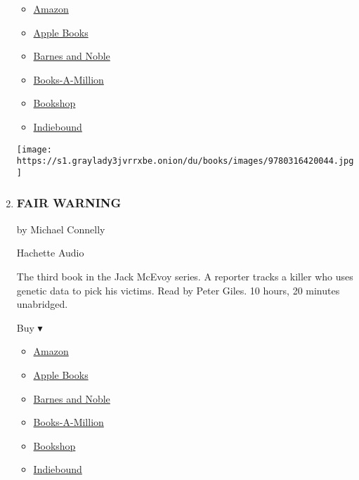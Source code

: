 \begin{enumerate}
  \begin{itemize}
  \tightlist
  \item
    \href{https://www.amazon.com/dp/0316420042?tag=NYTBSREV-20\&tag=NYTBS-20}{Amazon}
  \item
    \href{https://du-gae-books-dot-nyt-du-prd.appspot.com/buy?title=28+SUMMERS\&author=Elin+Hilderbrand}{Apple
    Books}
  \item
    \href{https://www.anrdoezrs.net/click-7990613-11819508?url=https\%3A\%2F\%2Fwww.barnesandnoble.com\%2Fw\%2F\%3Fean\%3D9781549117367}{Barnes
    and Noble}
  \item
    \href{https://www.anrdoezrs.net/click-7990613-35140?url=https\%3A\%2F\%2Fwww.booksamillion.com\%2Fp\%2F28\%2BSUMMERS\%2FElin\%2BHilderbrand\%2F9781549117367}{Books-A-Million}
  \item
    \href{https://bookshop.org/a/3546/9781549117367}{Bookshop}
  \item
    \href{https://www.indiebound.org/book/9781549117367?aff=NYT}{Indiebound}
  \end{itemize}

  \texttt{[image: https://s1.graylady3jvrrxbe.onion/du/books/images/9780316420044.jpg]}
\item
  \hypertarget{fair-warning}{%
  \subsubsection{FAIR WARNING}\label{fair-warning}}

  by Michael Connelly

  Hachette Audio

  The third book in the Jack McEvoy series. A reporter tracks a killer
  who uses genetic data to pick his victims. Read by Peter Giles. 10
  hours, 20 minutes unabridged.

  Buy ▾

  \begin{itemize}
  \tightlist
  \item
    \href{https://www.amazon.com/dp/0316539422?tag=NYTBSREV-20\&tag=NYTBS-20}{Amazon}
  \item
    \href{https://du-gae-books-dot-nyt-du-prd.appspot.com/buy?title=FAIR+WARNING\&author=Michael+Connelly}{Apple
    Books}
  \item
    \href{https://www.anrdoezrs.net/click-7990613-11819508?url=https\%3A\%2F\%2Fwww.barnesandnoble.com\%2Fw\%2F\%3Fean\%3D9781549157066}{Barnes
    and Noble}
  \item
    \href{https://www.anrdoezrs.net/click-7990613-35140?url=https\%3A\%2F\%2Fwww.booksamillion.com\%2Fp\%2FFAIR\%2BWARNING\%2FMichael\%2BConnelly\%2F9781549157066}{Books-A-Million}
  \item
    \href{https://bookshop.org/a/3546/9781549157066}{Bookshop}
  \item
    \href{https://www.indiebound.org/book/9781549157066?aff=NYT}{Indiebound}
  \end{itemize}


\end{enumerate}
